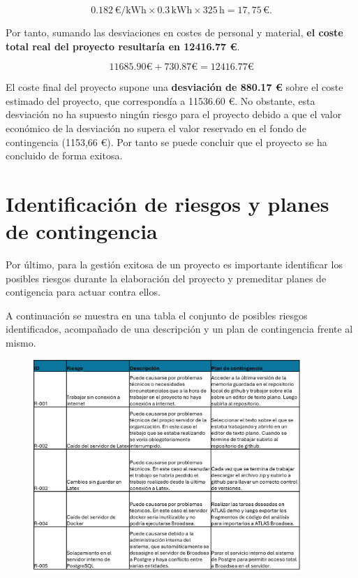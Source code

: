 \begin{equation}
0.182 \, \text{€/kWh} \times 0.3 \, \text{kWh} \times 325 \, \text{h} = 17,75 \, \text{€}.
\end{equation}

Por tanto, sumando las desviaciones en costes de personal y material, \textbf{el coste total real del proyecto resultaría en 12416.77 €}.

\begin{equation}
    11685.90 \text{€} + 730.87\text{€} =  12416.77 \text{€}
\end{equation}

El coste final del proyecto supone una\textbf{ desviación de 880.17 €} sobre el coste estimado del proyecto, que correspondía a 11536.60 €. No obstante, esta desviación no ha supuesto ningún riesgo para el proyecto debido a que el valor económico de la desviación no supera el valor reservado en el fondo de contingencia (1153,66 €). Por tanto se puede concluir que el proyecto se ha concluido de forma exitosa.

\section{Identificación de riesgos y planes de contingencia} \label{sec:03Riesgos}

Por último, para la gestión exitosa de un proyecto es importante identificar los posibles riesgos durante la elaboración del proyecto y premeditar planes de contigencia para actuar contra ellos. 

A continuación se muestra en una tabla el conjunto de posibles riesgos identificados, acompañado de una descripción y un plan de contingencia frente al mismo.

\begin{figure}[H]
    \centering
    \includegraphics[width=0.90\textwidth]{tables/tablaRiesgos.jpg}
    \label{table:tablaRiesgos}
\end{figure}

